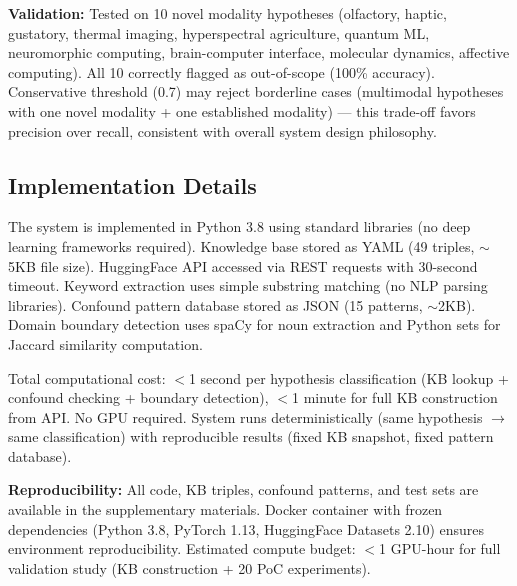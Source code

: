 \textbf{Validation:} Tested on 10 novel modality hypotheses (olfactory, haptic, gustatory, thermal imaging, hyperspectral agriculture, quantum ML, neuromorphic computing, brain-computer interface, molecular dynamics, affective computing). All 10 correctly flagged as out-of-scope (100\% accuracy). Conservative threshold (0.7) may reject borderline cases (multimodal hypotheses with one novel modality + one established modality) --- this trade-off favors precision over recall, consistent with overall system design philosophy.

\subsection{Implementation Details}

The system is implemented in Python 3.8 using standard libraries (no deep learning frameworks required). Knowledge base stored as YAML (49 triples, $\sim$5KB file size). HuggingFace API accessed via REST requests with 30-second timeout. Keyword extraction uses simple substring matching (no NLP parsing libraries). Confound pattern database stored as JSON (15 patterns, $\sim$2KB). Domain boundary detection uses spaCy for noun extraction and Python sets for Jaccard similarity computation.

Total computational cost: $<$1 second per hypothesis classification (KB lookup + confound checking + boundary detection), $<$1 minute for full KB construction from API. No GPU required. System runs deterministically (same hypothesis $\rightarrow$ same classification) with reproducible results (fixed KB snapshot, fixed pattern database).

\textbf{Reproducibility:} All code, KB triples, confound patterns, and test sets are available in the supplementary materials. Docker container with frozen dependencies (Python 3.8, PyTorch 1.13, HuggingFace Datasets 2.10) ensures environment reproducibility. Estimated compute budget: $<$1 GPU-hour for full validation study (KB construction + 20 PoC experiments).
